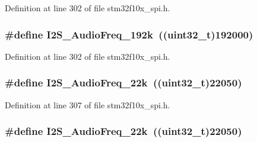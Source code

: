 Definition at line 302 of file stm32f10x\+\_\+spi.\+h.

\subsubsection[{\texorpdfstring{I2\+S\+\_\+\+Audio\+Freq\+\_\+192k}{I2S_AudioFreq_192k}}]{\setlength{\rightskip}{0pt plus 5cm}\#define I2\+S\+\_\+\+Audio\+Freq\+\_\+192k~(({\bf uint32\+\_\+t})192000)}\hypertarget{group___i2_s___audio___frequency_gadfdaed9a2acb71f2cdd737be81a6f747}{}\label{group___i2_s___audio___frequency_gadfdaed9a2acb71f2cdd737be81a6f747}


Definition at line 302 of file stm32f10x\+\_\+spi.\+h.

\subsubsection[{\texorpdfstring{I2\+S\+\_\+\+Audio\+Freq\+\_\+22k}{I2S_AudioFreq_22k}}]{\setlength{\rightskip}{0pt plus 5cm}\#define I2\+S\+\_\+\+Audio\+Freq\+\_\+22k~(({\bf uint32\+\_\+t})22050)}\hypertarget{group___i2_s___audio___frequency_gac6adafe5586e83c2408f1eab8edb4ab3}{}\label{group___i2_s___audio___frequency_gac6adafe5586e83c2408f1eab8edb4ab3}


Definition at line 307 of file stm32f10x\+\_\+spi.\+h.

\subsubsection[{\texorpdfstring{I2\+S\+\_\+\+Audio\+Freq\+\_\+22k}{I2S_AudioFreq_22k}}]{\setlength{\rightskip}{0pt plus 5cm}\#define I2\+S\+\_\+\+Audio\+Freq\+\_\+22k~(({\bf uint32\+\_\+t})22050)}\hypertarget{group___i2_s___audio___frequency_gac6adafe5586e83c2408f1eab8edb4ab3}{}\label{group___i2_s___audio___frequency_gac6adafe5586e83c2408f1eab8edb4ab3}


